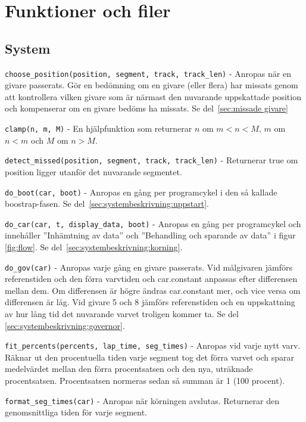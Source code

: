\section{Funktioner och filer}

\subsection{System}
\label{app:funktioner och filer:system}

\texttt{choose\_position(position, segment, track, track\_len)} - Anropas när en
givare passerats. Gör en bedömning om en givare (eller flera) har missats genom
att kontrollera vilken givare som är närmast den nuvarande uppskattade position
och kompenserar om en givare bedöms ha missats. Se del~\ref{sec:missade givare}

\texttt{clamp(n, m, M)} - En hjälpfunktion som returnerar $n$ om $m < n < M$,
$m$ om $n < m$ och $M$ om $n > M$.

\texttt{detect\_missed(position, segment, track, track\_len)} - Returnerar true
om position ligger utanför det nuvarande segmentet.

\texttt{do\_boot(car, boot)} - Anropas en gång per programcykel i den så kallade
boostrap-fasen. Se del~\ref{sec:systembeskrivning:uppstart}.

\texttt{do\_car(car, t, display\_data, boot)} - Anropas en gång per programcykel
och innehåller ''Inhämtning av data'' och ''Behandling och sparande av data'' i
figur \ref{fig:flow}.  Se del~\ref{sec:systembeskrivning:korning}.

\texttt{do\_gov(car)} - Anropas varje gång en givare passerats. Vid målgivaren
jämförs referenstiden och den förra varvtiden och car.constant anpassas efter
differensen mellan dem. Om differensen är högre ändras car.constant mer, och
vice versa om differensen är låg. Vid givare 5 och 8 jämförs referenstiden och
en uppskattning av hur lång tid det nuvarande varvet troligen kommer ta. Se del~
\ref{sec:systembeskrivning:governor}.

\texttt{fit\_percents(percents, lap\_time, seg\_times)} - Anropas vid varje nytt
varv. Räknar ut den procentuella tiden varje segment tog det förra varvet och
sparar medelvärdet mellan den förra procentsatsen och den nya, uträknade
procentsatsen. Procentsatsen normeras sedan så summan är 1 (100 procent).

\texttt{format\_seg\_times(car)} - Anropas när körningen avslutas. Returnerar
den genomsnittliga tiden för varje segment.

